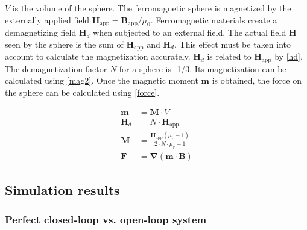 \documentclass[letterpaper, 10 pt, journal, twoside]{ieeetran}
\begin{document}
$V$ is the volume of the sphere.
The ferromagnetic sphere is magnetized by the externally applied field $\mathbf{H}_{\text{app}}=\mathbf{B}_{\text{app}}/\mu_0$. Ferromagnetic materials create a demagnetizing field $\mathbf{H}_d$ when subjected to an external field. The actual field $\mathbf{H}$ seen by the sphere is the sum of $\mathbf{H}_{\text{app}}$ and $\mathbf{H}_d$. This effect must be taken into account to calculate the magnetization accurately. $\mathbf{H}_d$ is related to $\mathbf{H}_{\text{app}}$ by \cref{hd}. The demagnetization factor $N$ for a sphere is -1/3. Its magnetization can be calculated using \cref{mag2}.
Once the magnetic moment $\mathbf{m}$ is obtained, the force on the sphere can be calculated using \cref{force}.
\vspace{-2em}

\begin{align}
\mathbf{m}&=\mathbf{M}\cdot V \label{mag}\\
\mathbf{H}_d&=N\cdot \mathbf{H}_{\text{app}}\label{hd}\\
\mathbf{M}&=\frac{\mathbf{H}_{\text{app}}\left ( \mu_r-1  \right )}{2\cdot N\cdot \mu_r-1} \label{mag2}\\
\mathbf{F}&=\mathbf{\nabla}(\mathbf{m}\cdot \mathbf{B}) \label{force}
\end{align}

\subsection{Simulation results}

\subsubsection{Perfect closed-loop vs. open-loop system}
\label{clol}
\end{document}
